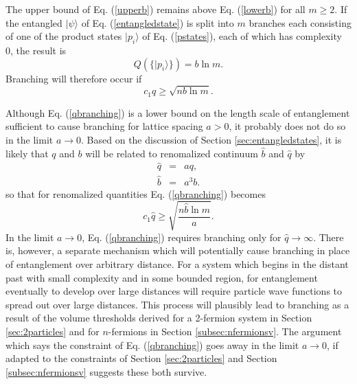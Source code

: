 \documentclass[twocolumn,amsmath,amssymb]{revtex4-1}
\begin{document}
The upper bound of Eq. (\ref{upperb}) remains above Eq. (\ref{lowerb}) for all
$m \ge 2$. If the entangled $|\psi \rangle $ of Eq. (\ref{entangledstate}) is split
into $m$ branches each consisting of one of the product states $|p_i \rangle $ of Eq. (\ref{pstates}),
each of which has complexity 0, the result is
\begin{equation}
  \label{splitintoproducts}
  Q( \{ |p_i \rangle  \}) = b \ln m.
\end{equation}
Branching will therefore occur if
\begin{equation}
  \label{qbranching}
  c_1 q \ge \sqrt{n b \ln m}.
\end{equation}

Although Eq. (\ref{qbranching}) is a lower bound
on the length scale of entanglement sufficient to cause branching
for lattice spacing $a > 0$, it probably does not do so in
the limit $a \rightarrow 0$. Based on the discussion
of 
Section \ref{sec:entangledstates}, it is likely that
$q$ and $b$ will be related to renomalized continuum
$\hat{b}$ and $\hat{q}$ by
\begin{subequations}
  \begin{eqnarray}
    \label{renormq}
    \hat{q} & = & a q, \\
    \label{renormb}
     \hat{b} &  = & a^3 b.
  \end{eqnarray}
\end{subequations}
so that for renomalized quantities Eq. (\ref{qbranching}) becomes
\begin{equation}
  \label{qbranchingr}
  c_1 \hat{q} \ge \sqrt{\frac{n \hat{b} \ln m}{a}}.
\end{equation}
In
the limit $a \rightarrow 0$,
Eq. (\ref{qbranching}) requires branching
only for $\hat{q} \rightarrow \infty$.
There is, however, a separate
mechanism which will potentially
cause branching in place of
entanglement over arbitrary distance.
For a system which
begins in the distant past with
small complexity and in some bounded region,
for entanglement eventually to develop over
large distances will require particle
wave functions to spread out over large
distances.
This process will
plausibly lead to branching as a result
of the volume thresholds derived for a
2-fermion system in Section
\ref{sec:2particles} and
for $n$-fermions in Section \ref{subsec:nfermionsv}.
The argument which says the constraint of
Eq. (\ref{qbranching}) goes away in the limit
$a \rightarrow 0$, if adapted to
the constraints of Section
\ref{sec:2particles} and Section \ref{subsec:nfermionsv}
suggests these both survive.
\end{document}
